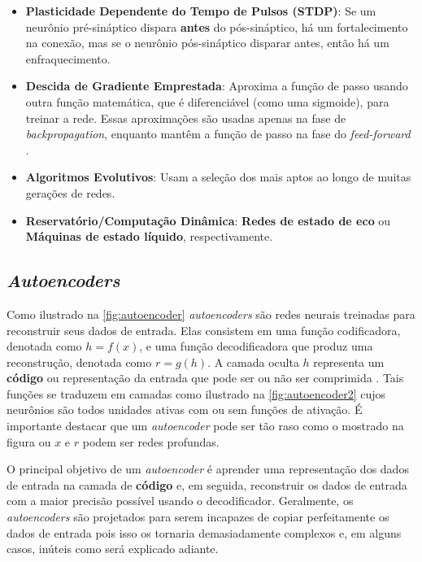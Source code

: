 			\begin{itemize}
				\item \textbf{Plasticidade Dependente do Tempo de Pulsos (STDP)}: Se um neurônio pré-sináptico dispara \textbf{antes} do pós-sináptico, há um fortalecimento na conexão, mas se o neurônio pós-sináptico disparar antes, então há um enfraquecimento.
				\item \textbf{Descida de Gradiente Emprestada}: Aproxima a função de passo usando outra função matemática, que é diferenciável (como uma sigmoide), para treinar a rede. Essas aproximações são usadas apenas na fase de \textit{backpropagation}, enquanto mantêm a função de passo na fase do \textit{feed-forward} \cite{kasabov2019time}.
				\item \textbf{Algoritmos Evolutivos}: Usam a seleção dos mais aptos ao longo de muitas gerações de redes.
				\item \textbf{Reservatório/Computação Dinâmica}: \textbf{Redes de estado de eco} ou \textbf{Máquinas de estado líquido}, respectivamente.
			\end{itemize}
		
		\subsection{\textit{Autoencoders}}
		
			\par Como ilustrado na  \autoref{fig:autoencoder} \textit{autoencoders} são redes neurais treinadas para reconstruir seus dados de entrada. Elas consistem em uma função codificadora, denotada como $h = f(x)$, e uma função decodificadora que produz uma reconstrução, denotada como $r = g(h)$. A camada oculta $h$ representa um \textbf{código} ou representação da entrada que pode ser ou não ser comprimida \cite{Goodfellow-et-al-2016}. Tais funções se traduzem em camadas como ilustrado na  \autoref{fig:autoencoder2} cujos neurônios são todos unidades ativas com ou sem funções de ativação. É importante destacar que um \textit{autoencoder} pode ser tão raso como o mostrado na figura ou $x$ e $r$ podem ser redes profundas.
			
			\par O principal objetivo de um \textit{autoencoder} é aprender uma representação dos dados de entrada na camada de \textbf{código} e, em seguida, reconstruir os dados de entrada com a maior precisão possível usando o decodificador. Geralmente, os \textit{autoencoders} são projetados para serem incapazes de copiar perfeitamente os dados de entrada pois isso os tornaria demasiadamente complexos e, em alguns casos, inúteis como será explicado adiante.

